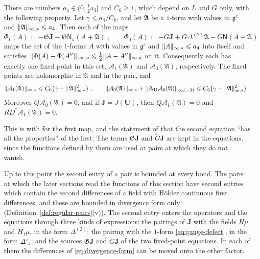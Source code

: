 \documentclass[11pt]{preprint}
\DeclarePairedDelimiter{\norm}{\lVert}{\rVert}
\numberwithin{equation}{section}
\begin{document}
\begin{proposition}\label{prop:fixed-points}
There are numbers $a_4 \in (0, \frac{1}{2}a_3]$ and $C_6 \geqslant 1$, which depend on $L$ and $G$ only, with the following property. Let $\gamma \leqslant a_4/C_6$, and let $\mathfrak A$ be a $1$-form with values in $\mathfrak g^c$ and $\norm{\mathfrak A}_{\infty,*} \leqslant a_4$. Then each of the maps
\begin{equation}\label{eq:fixed-point-maps}
    \Phi_1(A) \coloneqq -\mathfrak G\mathbf J - \mathfrak G\mathsf N_\pi(A + \mathfrak A)\;,
    \qquad
    \Phi_0(A) \coloneqq -\tilde G\mathbf J + \tilde G\Delta^{(2)}\mathfrak A - \tilde G\mathsf N(A + \mathfrak A)
\end{equation}
maps the set of the $1$-forms $A$ with values in $\mathfrak g^c$ and $\norm A_{\infty,*} \leqslant a_4$ into itself and satisfies $\norm{\Phi(A) - \Phi(A'')}_{\infty,*} \leqslant \frac{1}{2}\norm{A - A''}_{\infty,*}$ on it. Consequently each has exactly one fixed point in this set, $\mathcal A_1(\mathfrak A)$ and $\mathcal A_0(\mathfrak A)$, respectively. The fixed points are holomorphic in $\mathfrak A$ and in the pair, and
\begin{equation}\label{eq:fixed-point-bound}
    \norm{\mathcal A_1(\mathfrak A)}_{\infty,*} \leqslant C_6\bigl(\gamma + \norm{\mathfrak A}_{\infty,*}^2\bigr)\;,
    \qquad
    \norm{\mathcal A_0(\mathfrak A)}_{\infty,*} + \norm{\Delta_{\mathbf U}\mathcal A_0(\mathfrak A)}_{\infty,(-3)} \leqslant C_6\bigl(\gamma + \norm{\mathfrak A}_{\infty,*}^2\bigr)\;.
\end{equation}
Moreover $Q\mathcal A_0(\mathfrak A) = 0$, and if $\mathbf J = J(\mathbf U)$, then $Q\mathcal A_1(\mathfrak A) = 0$ and $RD^*\mathcal A_1(\mathfrak A) = 0$.
\end{proposition}

This is \cite[Proposition~6, p.~295]{BalabanVAR} with \cite[(116)--(121)]{BalabanVAR} for the first map, and the statement of \cite[p.~300]{BalabanVAR} that the second equation ``has all the properties'' of the first. The terms $\mathfrak G\mathbf J$ and $\tilde G\mathbf J$ are kept in the equations, since the functions defined by them are used at pairs at which they do not vanish.

Up to this point the second entry of a pair is bounded at every bond. The pairs at which the later sections read the functions of this section have second entries which contain the second differences of a field with H\"older continuous first differences, and these are bounded in divergence form only (Definition~\ref{def:regular-pairs}(v)). The second entry enters the operators and the equations through three kinds of expressions: the pairings of $\mathbf J$ with the fields $H\mu$ and $H_1\mu$, in the form $\Delta^{(2)}$; the pairing with the $1$-form \eqref{eq:gauge-defect}, in the form $\Delta'_\pi$; and the sources $\mathfrak G\mathbf J$ and $\tilde G\mathbf J$ of the two fixed-point equations. In each of them the differences of \eqref{eq:divergence-form} can be moved onto the other factor.
\end{document}
